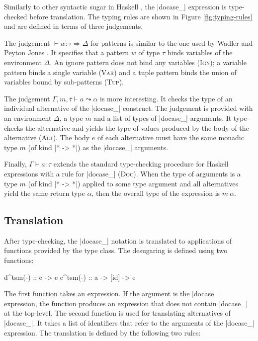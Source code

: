 \documentclass{sigplanconf}
\begin{document}
Similarly to other syntactic sugar in Haskell \cite{groupordercompre}, the |docase_| expression 
is type-checked before translation. The typing rules are shown in Figure \ref{fig:typing-rules} 
and are defined in terms of three judgements.

The judgement $\vdash w : \tau \Rightarrow \Delta$ for patterns is similar to the one used by
Wadler and Peyton Jones \cite{groupordercompre}. It specifies that a pattern $w$ of type $\tau$ binds 
variables of the environment $\Delta$. An ignore pattern does not bind any variables (\textsc{Ign}); 
a variable pattern binds a single variable (\textsc{Var}) and a tuple pattern binds the union of 
variables bound by sub-patterns (\textsc{Tup}).

The judgement $\Gamma, m, \bar{\tau} \vdash a \leadsto \alpha $ is more interesting. It 
checks the type of an individual alternative of the |docase_| construct. The judgement is provided 
with an environment $\Delta$, a  type $m$ and a list of types of 
|docase_| arguments. It type-checks the alternative and yields the type of values produced by the
body of the alternative (\textsc{Alt}). The body $e$ of each alternative must have the same monadic 
type $m$ (of kind |* -> *|) as the |docase_| arguments. 

Finally, $\Gamma \vdash a : \tau$ extends the standard type-checking procedure
for Haskell expressions with a rule for |docase_| (\textsc{Doc}). When the type of arguments is 
a  type $m$ (of kind |* -> *|) applied to some type argument and all 
alternatives yield the same return type $\alpha$, then the overall type of the expression is 
$m \ \alpha$.


\subsection{Translation}
\label{sec:extension-translation}

After type-checking, the |docase_| notation is translated to applications of functions provided by the 
 type class. The desugaring is defined using two functions:

\begin{code}
d^tsm(-)  :: e -> e
c^tsm(-)  :: a -> [id] -> e
\end{code}
The first function takes an expression. If the argument is the |docase_| expression, the function
produces an expression that does not contain |docase_| at the top-level. The second function is used
for translating alternatives of |docase_|. It takes a list of identifiers that refer to the arguments
of the |docase_| expression. The translation is defined by the following two rules:
\end{document}
